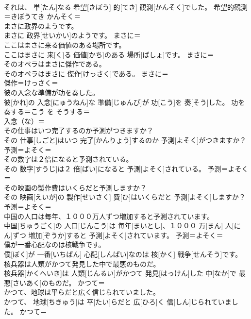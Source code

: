 \documentclass[8pt]{extreport}
\begin{document}
\begin{CJK}{UTF8}{min}
\\	それは、 単[たん]なる 希望[きぼう] 的[てき] 観測[かんそく]でした。	希望的観測＝きぼうてき かんそく＝ 
\\	まさに政界のようです。	
\\	まさに 政界[せいかい]のようです。	まさに＝ 
\\	ここはまさに来る価値のある場所です。	
\\	ここはまさに 来[く]る 価値[かち]のある 場所[ばしょ]です。	まさに＝ 
\\	そのオペラはまさに傑作である。	
\\	そのオペラはまさに 傑作[けっさく]である。	まさに＝ 
\\	傑作＝けっさく＝ 
\\	彼の入念な準備が功を奏した。	
\\	彼[かれ]の 入念[にゅうねん]な 準備[じゅんび]が 功[こう]を 奏[そう]した。	功を奏する＝こう を そうする＝ 
\\	入念（な）＝ 
\\	その仕事はいつ完了するのか予測がつきますか？	
\\	その 仕事[しごと]はいつ 完了[かんりょう]するのか 予測[よそく]がつきますか？	予測＝よそく＝ 
\\	その数字は２倍になると予測されている。	
\\	その 数字[すうじ]は２ 倍[ばい]になると 予測[よそく]されている。	予測＝よそく＝ 
\\	その映画の製作費はいくらだと予測しますか？	
\\	その 映画[えいが]の 製作[せいさく] 費[ひ]はいくらだと 予測[よそく]しますか？	予測＝よそく＝ 
\\	中国の人口は毎年、１０００万人ずつ増加すると予測されています。	
\\	中国[ちゅうごく]の 人口[じんこう]は 毎年[まいとし]、１０００ 万[まん] 人[にん]ずつ 増加[ぞうか]すると 予測[よそく]されています。	予測＝よそく＝ 
\\	僕が一番心配なのは核戦争です。	
\\	僕[ぼく]が 一番[いちばん] 心配[しんぱい]なのは 核[かく] 戦争[せんそう]です。	
\\	核兵器は人類がかつて発見した中で最悪のものだ。	
\\	核兵器[かくへいき]は 人類[じんるい]がかつて 発見[はっけん]した 中[なか]で 最悪[さいあく]のものだ。	かつて＝ 
\\	かつて、地球は平らだと広く信じられていました。	
\\	かつて、 地球[ちきゅう]は 平[たい]らだと 広[ひろ]く 信[しん]じられていました。	かつて＝ 

\end{CJK}
\end{document}
